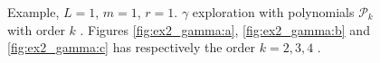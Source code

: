 \begin{figure}
    \caption{ Example, $L=1$, $m=1$, $r=1$. $\gamma$ exploration with polynomials $\mathcal{P}_{k} $ with order $k$ . Figures \ref{fig:ex2_gamma:a}, \ref{fig:ex2_gamma:b} and \ref{fig:ex2_gamma:c} has respectively the order $k=2,3, 4$ .  }
    \label{fig:ex2_gamma}
\end{figure}

